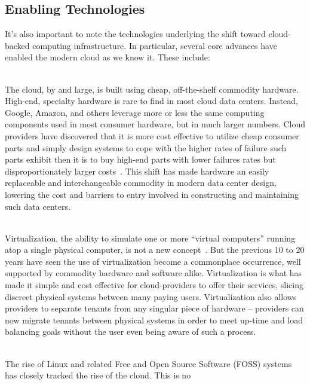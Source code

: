 \subsection{Enabling Technologies}

It's also important to note the technologies underlying the shift
toward cloud-backed computing infrastructure. In particular, several
core advances have enabled the modern cloud as we know it. These
include:

\begin{packed_desc}
\item[Commoditization of Hardware] \hfill \\ The cloud, by and large,
  is built using cheap, off-the-shelf commodity hardware. High-end,
  specialty hardware is rare to find in most cloud data
  centers. Instead, Google, Amazon, and others leverage more or less
  the same computing components used in most consumer hardware, but in
  much larger numbers. Cloud providers have discovered that it is more
  cost effective to utilize cheap consumer parts and simply design
  systems to cope with the higher rates of failure such parts exhibit
  then it is to buy high-end parts with lower failures rates but
  disproportionately larger costs~\cite{atwood2007}. This shift has
  made hardware an easily replaceable and interchangeable commodity in
  modern data center design, lowering the cost and barriers to entry
  involved in constructing and maintaining such data centers.
\item[Virtualization] \hfill \\ Virtualization, the ability to
  simulate one or more ``virtual computers'' running atop a single
  physical computer, is not a new concept~\cite{goldberg1974}. But the
  previous 10 to 20 years have seen the use of virtualization become a
  commonplace occurrence, well supported by commodity hardware and
  software alike. Virtualization is what has made it simple and cost
  effective for cloud-providers to offer their services, slicing
  discreet physical systems between many paying users. Virtualization
  also allows providers to separate tenants from any singular piece of
  hardware -- providers can now migrate tenants between physical
  systems in order to meet up-time and load balancing goals without
  the user even being aware of such a process.
\item[Free and Open Source Software (and Hardware)] \hfill \\ The rise
  of Linux and related Free and Open Source Software (FOSS) systems
  has closely tracked the rise of the cloud. This is no

\end{packed_desc}

